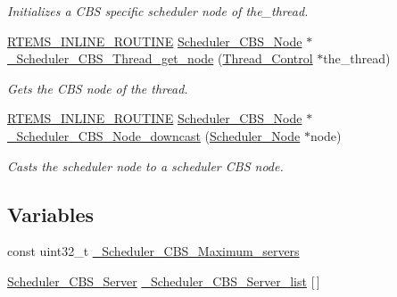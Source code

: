\begin{DoxyCompactItemize}
\begin{DoxyCompactList}\small\item\em Initializes a C\+BS specific scheduler node of {\itshape the\+\_\+thread}. \end{DoxyCompactList}\item 
\mbox{\hyperlink{group__RTEMSScoreBaseDefs_gac216239df231d5dbd15e3520b0b9313f}{R\+T\+E\+M\+S\+\_\+\+I\+N\+L\+I\+N\+E\+\_\+\+R\+O\+U\+T\+I\+NE}} \mbox{\hyperlink{structScheduler__CBS__Node}{Scheduler\+\_\+\+C\+B\+S\+\_\+\+Node}} $\ast$ \mbox{\hyperlink{group__RTEMSScoreSchedulerCBS_gac2cf154d9842c9449d74735b2b1d0a82}{\+\_\+\+Scheduler\+\_\+\+C\+B\+S\+\_\+\+Thread\+\_\+get\+\_\+node}} (\mbox{\hyperlink{struct__Thread__Control}{Thread\+\_\+\+Control}} $\ast$the\+\_\+thread)
\begin{DoxyCompactList}\small\item\em Gets the C\+BS node of the thread. \end{DoxyCompactList}\item 
\mbox{\hyperlink{group__RTEMSScoreBaseDefs_gac216239df231d5dbd15e3520b0b9313f}{R\+T\+E\+M\+S\+\_\+\+I\+N\+L\+I\+N\+E\+\_\+\+R\+O\+U\+T\+I\+NE}} \mbox{\hyperlink{structScheduler__CBS__Node}{Scheduler\+\_\+\+C\+B\+S\+\_\+\+Node}} $\ast$ \mbox{\hyperlink{group__RTEMSScoreSchedulerCBS_gae69b2b7650d05a7f48695c83f815d6fd}{\+\_\+\+Scheduler\+\_\+\+C\+B\+S\+\_\+\+Node\+\_\+downcast}} (\mbox{\hyperlink{structScheduler__Node}{Scheduler\+\_\+\+Node}} $\ast$node)
\begin{DoxyCompactList}\small\item\em Casts the scheduler node to a scheduler C\+BS node. \end{DoxyCompactList}\end{DoxyCompactItemize}
\subsection*{Variables}
\begin{DoxyCompactItemize}
\item 
const uint32\+\_\+t \mbox{\hyperlink{group__RTEMSScoreSchedulerCBS_gad7073b55d1b96892798bbc516978f0ee}{\+\_\+\+Scheduler\+\_\+\+C\+B\+S\+\_\+\+Maximum\+\_\+servers}}
\item 
\mbox{\hyperlink{structScheduler__CBS__Server}{Scheduler\+\_\+\+C\+B\+S\+\_\+\+Server}} \mbox{\hyperlink{group__RTEMSScoreSchedulerCBS_ga12ae8c17a62c8837b43a6a6e7a1844f4}{\+\_\+\+Scheduler\+\_\+\+C\+B\+S\+\_\+\+Server\+\_\+list}} \mbox{[}$\,$\mbox{]}
\end{DoxyCompactItemize}


